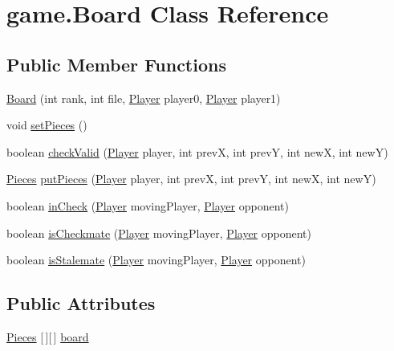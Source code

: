 \hypertarget{classgame_1_1_board}{}\section{game.\+Board Class Reference}
\label{classgame_1_1_board}
\subsection*{Public Member Functions}
\begin{DoxyCompactItemize}
\item 
\mbox{\hyperlink{classgame_1_1_board_afd26ab4fbb8f5ce04a9bf8a69782c4db}{Board}} (int rank, int file, \mbox{\hyperlink{classgame_1_1_player}{Player}} player0, \mbox{\hyperlink{classgame_1_1_player}{Player}} player1)
\item 
void \mbox{\hyperlink{classgame_1_1_board_a9955ee857e479d54216ce6d6a12e8145}{set\+Pieces}} ()
\item 
boolean \mbox{\hyperlink{classgame_1_1_board_af34ca67982d198cf4acdaa8baa12c96b}{check\+Valid}} (\mbox{\hyperlink{classgame_1_1_player}{Player}} player, int prevX, int prevY, int newX, int newY)
\item 
\mbox{\hyperlink{classpieces_1_1_pieces}{Pieces}} \mbox{\hyperlink{classgame_1_1_board_a512879cf8a8705450f5e94ecb147b1ff}{put\+Pieces}} (\mbox{\hyperlink{classgame_1_1_player}{Player}} player, int prevX, int prevY, int newX, int newY)
\item 
boolean \mbox{\hyperlink{classgame_1_1_board_a631a4ad5cde58f7263ffc57b97458faf}{in\+Check}} (\mbox{\hyperlink{classgame_1_1_player}{Player}} moving\+Player, \mbox{\hyperlink{classgame_1_1_player}{Player}} opponent)
\item 
boolean \mbox{\hyperlink{classgame_1_1_board_a95871969333ec29f0299b1bbeb277121}{is\+Checkmate}} (\mbox{\hyperlink{classgame_1_1_player}{Player}} moving\+Player, \mbox{\hyperlink{classgame_1_1_player}{Player}} opponent)
\item 
boolean \mbox{\hyperlink{classgame_1_1_board_a7f5f2366e087babfd08a82afc332771c}{is\+Stalemate}} (\mbox{\hyperlink{classgame_1_1_player}{Player}} moving\+Player, \mbox{\hyperlink{classgame_1_1_player}{Player}} opponent)
\end{DoxyCompactItemize}
\subsection*{Public Attributes}
\begin{DoxyCompactItemize}
\item 
\mbox{\hyperlink{classpieces_1_1_pieces}{Pieces}} \mbox{[}$\,$\mbox{]}\mbox{[}$\,$\mbox{]} \mbox{\hyperlink{classgame_1_1_board_a88a0b3ed05aed6166209784f05fd218d}{board}}
\end{DoxyCompactItemize}


